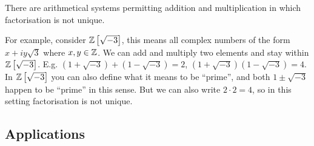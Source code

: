 \documentclass[../main.tex]{subfiles}
\begin{document}
\begin{remark}
  \nonexaminable
  There are arithmetical systems permitting addition and multiplication in which factorisation is not unique.

  For example, consider $\mathbb{Z}\left[\sqrt{-3}\right]$, this means all complex numbers of the form $x + iy\sqrt{3}$ where $x, y \in \mathbb{Z}$.
  We can add and multiply two elements and stay within $\mathbb{Z}\left[\sqrt{-3}\right]$.
  E.g. $(1 + \sqrt{-3}) + (1 - \sqrt{-3}) = 2$, $(1 + \sqrt{-3})(1 - \sqrt{-3}) = 4$.
  In $\mathbb{Z}\left[\sqrt{-3}\right]$ you can also define what it means to be ``prime'', and both $1 \pm \sqrt{-3}$ happen to be ``prime'' in this sense.
  But we can also write $2 \cdot 2 = 4$, so in this setting factorisation is not unique.
\end{remark}
\subsection{Applications}
\end{document}

